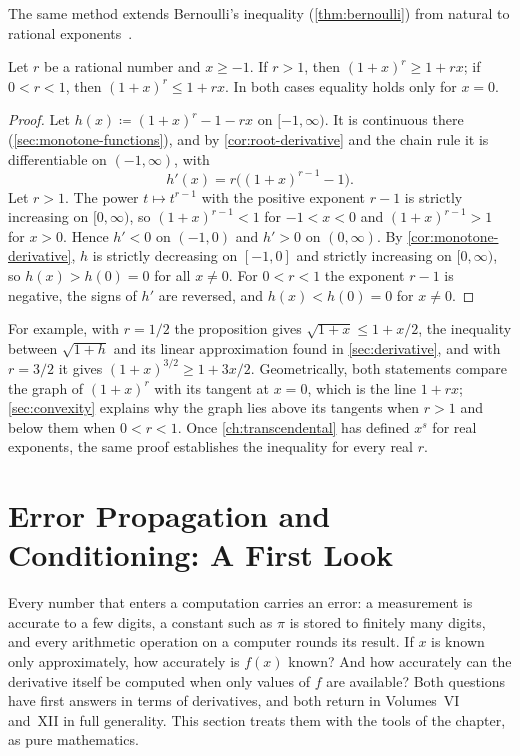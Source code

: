 The same method extends Bernoulli's inequality (\cref{thm:bernoulli}) from natural to rational exponents~\cite{mitrinovic1993bernoulli}.

\begin{proposition}
\label{prop:bernoulli-rational}
Let $r$ be a rational number and $x\ge-1$. If $r>1$, then $(1+x)^r\ge1+rx$; if $0<r<1$, then $(1+x)^r\le1+rx$. In both cases equality holds only for $x=0$.
\end{proposition}

\begin{proof}
Let $h(x)\coloneqq(1+x)^r-1-rx$ on $[-1,\infty)$. It is continuous there (\cref{sec:monotone-functions}), and by \cref{cor:root-derivative} and the chain rule it is differentiable on $(-1,\infty)$, with
\[
h'(x)=r\bigl((1+x)^{r-1}-1\bigr).
\]
Let $r>1$. The power $t\mapsto t^{r-1}$ with the positive exponent $r-1$ is strictly increasing on $[0,\infty)$, so $(1+x)^{r-1}<1$ for $-1<x<0$ and $(1+x)^{r-1}>1$ for $x>0$. Hence $h'<0$ on $(-1,0)$ and $h'>0$ on $(0,\infty)$. By \cref{cor:monotone-derivative}, $h$ is strictly decreasing on $[-1,0]$ and strictly increasing on $[0,\infty)$, so $h(x)>h(0)=0$ for all $x\ne0$. For $0<r<1$ the exponent $r-1$ is negative, the signs of $h'$ are reversed, and $h(x)<h(0)=0$ for $x\ne0$.
\end{proof}

For example, with $r=1/2$ the proposition gives $\sqrt{1+x}\le1+x/2$, the inequality between $\sqrt{1+h}$ and its linear approximation found in \cref{sec:derivative}, and with $r=3/2$ it gives $(1+x)^{3/2}\ge1+3x/2$. Geometrically, both statements compare the graph of $(1+x)^r$ with its tangent at $x=0$, which is the line $1+rx$; \cref{sec:convexity} explains why the graph lies above its tangents when $r>1$ and below them when $0<r<1$. Once \cref{ch:transcendental} has defined $x^s$ for real exponents, the same proof establishes the inequality for every real $r$.

\section{Error Propagation and Conditioning: A First Look}
\label{sec:conditioning}

Every number that enters a computation carries an error: a measurement is accurate to a few digits, a constant such as $\pi$ is stored to finitely many digits, and every arithmetic operation on a computer rounds its result. If $x$ is known only approximately, how accurately is $f(x)$ known? And how accurately can the derivative itself be computed when only values of $f$ are available? Both questions have first answers in terms of derivatives, and both return in Volumes~VI and~XII in full generality. This section treats them with the tools of the chapter, as pure mathematics.

